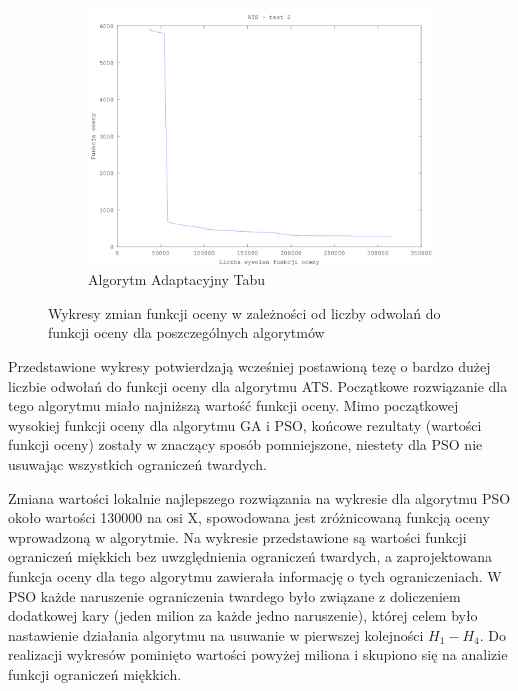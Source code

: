 \begin{figure}[H]
          \\
        \begin{subfigure}[b]{0.5\textwidth}
                \includegraphics[width=\textwidth]{ats_test_2.png}
                \caption{Algorytm Adaptacyjny Tabu}
        \end{subfigure}
        \caption{Wykresy zmian funkcji oceny w zależności od liczby odwolań do funkcji oceny dla poszczególnych algorytmów}
\end{figure}


\par Przedstawione wykresy potwierdzają wcześniej postawioną tezę o bardzo dużej liczbie odwołań do funkcji oceny dla algorytmu ATS. Początkowe rozwiązanie dla tego algorytmu miało najniższą wartość funkcji oceny. Mimo początkowej wysokiej funkcji oceny dla algorytmu GA i PSO, końcowe rezultaty (wartości funkcji oceny) zostały w znaczący sposób pomniejszone, niestety dla PSO nie usuwając wszystkich ograniczeń twardych. 
\par Zmiana wartości lokalnie najlepszego rozwiązania na wykresie dla algorytmu PSO około wartości 130000 na osi X, spowodowana jest zróżnicowaną funkcją oceny wprowadzoną w algorytmie. Na wykresie przedstawione są wartości funkcji ograniczeń miękkich bez uwzględnienia ograniczeń twardych, a zaprojektowana funkcja oceny dla tego algorytmu zawierała informację o tych ograniczeniach. W PSO każde naruszenie ograniczenia twardego było związane z doliczeniem dodatkowej kary (jeden milion za każde jedno naruszenie), której celem było nastawienie działania algorytmu na usuwanie w pierwszej kolejności ${H_{1}- H_{4}}$. Do realizacji wykresów pominięto wartości powyżej miliona i skupiono się na analizie funkcji ograniczeń miękkich.


